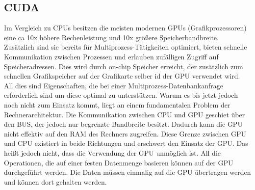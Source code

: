\subsection{CUDA}
\label{sec:CUDA}

Im Vergleich zu CPUs besitzen die meisten modernen GPUs (Grafikprozessoren) eine ca 10x höhere Rechenleistung und 10x größere Speicherbandbreite. Zusätzlich sind sie bereits für Multiprozess-Tätigkeiten optimiert, bieten schnelle Kommunikation zwischen Prozessen und erlauben zufälligen Zugriff auf Speicheradressen. Dies wird durch on-chip Speicher erreicht, der zusätzlich zum schnellen Grafikspeicher auf der Grafikarte selber id der GPU verwendet wird. All dies sind Eigenschaften, die bei einer Multiprozess-Datenbankanfrage erforderlich sind um diese optimal zu unterstützen. Warum es bis jetzt jedoch noch nicht zum Einsatz kommt, liegt an einem fundamentalen Problem der Rechnerarchitektur. Die Kommunikation zwischen CPU und GPU geschiet über den BUS, der jedoch nur begrenzte Bandbreite besitzt. Dadurch kann die GPU nicht effektiv auf den RAM des Rechners zugreifen. Diese Grenze zwischen GPU und CPU existiert in beide Richtungen und erschwert den Einsatz der GPU. Das heißt jedoch nicht, dass die Verwendung der GPU unmöglich ist. All die Operationen, die auf einer festen Datenmenge basieren können auf der GPU durchgeführt werden. Die Daten müssen einmalig auf die GPU übertragen werden und können dort gehalten werden.

